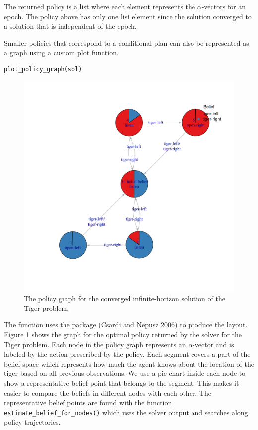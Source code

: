 The returned policy is a list where each element represents the \(\alpha\)-vectors
for an epoch. The policy above has only one list element since the solution
converged to a solution that is independent of the epoch.

Smaller policies that
correspond to a conditional plan
can also be represented as a graph using a custom plot function.

\begin{verbatim}
plot_policy_graph(sol)
\end{verbatim}

\begin{figure}
\includegraphics[width=1\linewidth]{pomdp_files/figure-latex/tiger-infinite-horizon-1} \caption{The policy graph for the converged infinite-horizon solution of the Tiger problem.}\label{fig:tiger-infinite-horizon}
\end{figure}

The function uses the  package (Csardi and Nepusz 2006) to produce the layout.
Figure \ref{fig:tiger-infinite-horizon} shows the graph for the optimal policy returned
by the solver for the Tiger problem.
Each node in the policy graph represents an \(\alpha\)-vector and is labeled by the
action prescribed by the policy.
Each segment covers a part of the belief space which represents how much the agent knows about the location of
the tiger based on all previous observations.
We use a pie chart inside each node to show a representative belief point that belongs to the segment.
This makes it easier to compare the beliefs in different nodes with each other.
The representative belief points are found with the function
\texttt{estimate\_belief\_for\_nodes()} which uses the solver output and searches along policy trajectories.

